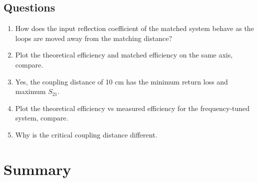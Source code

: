 \documentclass{article}
\begin{document}
\subsection{Questions}

\begin{enumerate}
	\item How does the input reflection coefficient of the matched system behave as the loops are moved away from the matching distance?
	\item Plot the theoretical efficiency and matched efficiency on the same axis, compare.
	\item Yes, the coupling distance of 10 cm has the minimum return loss and maximum $S_{21}$.
	\item Plot the theoretical efficiency vs measured efficiency for the frequency-tuned system, compare.
	\item Why is the critical coupling distance different.
\end{enumerate}

\section{Summary}
\end{document}
